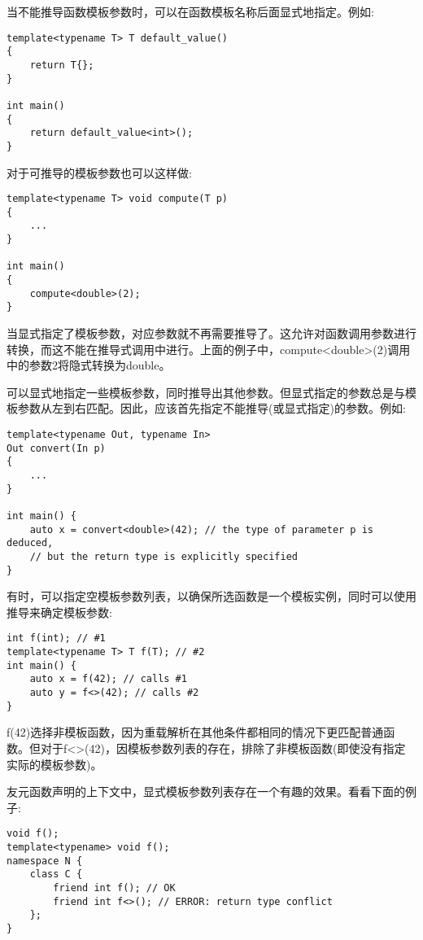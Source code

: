 当不能推导函数模板参数时，可以在函数模板名称后面显式地指定。例如:

\begin{lstlisting}[style=styleCXX]
template<typename T> T default_value()
{
	return T{};
}

int main()
{
	return default_value<int>();
}
\end{lstlisting}

对于可推导的模板参数也可以这样做:

\begin{lstlisting}[style=styleCXX]
template<typename T> void compute(T p)
{
	...
}

int main()
{
	compute<double>(2);
}
\end{lstlisting}

当显式指定了模板参数，对应参数就不再需要推导了。这允许对函数调用参数进行转换，而这不能在推导式调用中进行。上面的例子中，compute<double>(2)调用中的参数2将隐式转换为double。

可以显式地指定一些模板参数，同时推导出其他参数。但显式指定的参数总是与模板参数从左到右匹配。因此，应该首先指定不能推导(或显式指定)的参数。例如:

\begin{lstlisting}[style=styleCXX]
template<typename Out, typename In>
Out convert(In p)
{
	...
}

int main() {
	auto x = convert<double>(42); // the type of parameter p is deduced,
	// but the return type is explicitly specified
}
\end{lstlisting}

有时，可以指定空模板参数列表，以确保所选函数是一个模板实例，同时可以使用推导来确定模板参数:

\begin{lstlisting}[style=styleCXX]
int f(int); // #1
template<typename T> T f(T); // #2
int main() {
	auto x = f(42); // calls #1
	auto y = f<>(42); // calls #2
}
\end{lstlisting}

f(42)选择非模板函数，因为重载解析在其他条件都相同的情况下更匹配普通函数。但对于f<>(42)，因模板参数列表的存在，排除了非模板函数(即使没有指定实际的模板参数)。

友元函数声明的上下文中，显式模板参数列表存在一个有趣的效果。看看下面的例子:

\begin{lstlisting}[style=styleCXX]
void f();
template<typename> void f();
namespace N {
	class C {
		friend int f(); // OK
		friend int f<>(); // ERROR: return type conflict
	};
}
\end{lstlisting}


